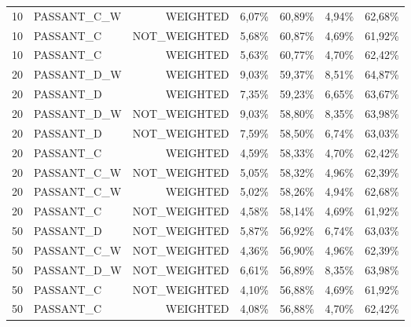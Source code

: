 \begin{table}[H]
{\begin{tabular}{ c l r c c c c }
	10 & PASSANT\_C\_W &   WEIGHTED &     6,07\% &    60,89\% &     4,94\% &    62,68\% \\
	
	10 &  PASSANT\_C & NOT\_WEIGHTED &     5,68\% &    60,87\% &     4,69\% &    61,92\% \\
	
	10 &  PASSANT\_C &   WEIGHTED &     5,63\% &    60,77\% &     4,70\% &    62,42\% \\
	
	20 & PASSANT\_D\_W &   WEIGHTED &     9,03\% &    59,37\% &     8,51\% &    64,87\% \\
	
	20 &  PASSANT\_D &   WEIGHTED &     7,35\% &    59,23\% &     6,65\% &    63,67\% \\
	
	20 & PASSANT\_D\_W & NOT\_WEIGHTED &     9,03\% &    58,80\% &     8,35\% &    63,98\% \\
	
	20 &  PASSANT\_D & NOT\_WEIGHTED &     7,59\% &    58,50\% &     6,74\% &    63,03\% \\
	
	20 &  PASSANT\_C &   WEIGHTED &     4,59\% &    58,33\% &     4,70\% &    62,42\% \\
	
	20 & PASSANT\_C\_W & NOT\_WEIGHTED &     5,05\% &    58,32\% &     4,96\% &    62,39\% \\
	
	20 & PASSANT\_C\_W &   WEIGHTED &     5,02\% &    58,26\% &     4,94\% &    62,68\% \\
	
	20 &  PASSANT\_C & NOT\_WEIGHTED &     4,58\% &    58,14\% &     4,69\% &    61,92\% \\
	
	50 &  PASSANT\_D & NOT\_WEIGHTED &     5,87\% &    56,92\% &     6,74\% &    63,03\% \\
	
	50 & PASSANT\_C\_W & NOT\_WEIGHTED &     4,36\% &    56,90\% &     4,96\% &    62,39\% \\
	
	50 & PASSANT\_D\_W & NOT\_WEIGHTED &     6,61\% &    56,89\% &     8,35\% &    63,98\% \\
	
	50 &  PASSANT\_C & NOT\_WEIGHTED &     4,10\% &    56,88\% &     4,69\% &    61,92\% \\
	
	50 &  PASSANT\_C &   WEIGHTED &     4,08\% &    56,88\% &     4,70\% &    62,42\% \\
	

\end{tabular}}
\end{table}
